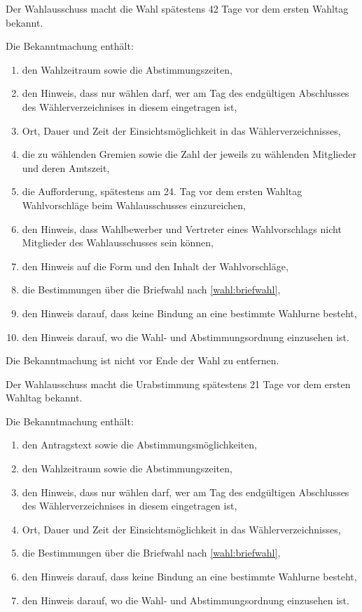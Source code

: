 \begin{jurdoc}
\label{wahl:bekanntmachung-wahl}
Der Wahlausschuss macht die Wahl spätestens 42 Tage vor dem ersten Wahltag bekannt.

Die Bekanntmachung enthält:
\begin{enumerate}
     \item den Wahlzeitraum sowie die Abstimmungszeiten,
     \item den Hinweis, dass nur wählen darf, wer am Tag des endgültigen Abschlusses des Wählerverzeichnises in diesem eingetragen ist,
     \item Ort, Dauer und Zeit der Einsichtsmöglichkeit in das Wählerverzeichnisses,
     \item die zu wählenden Gremien sowie die Zahl der jeweils zu wählenden Mitglieder und deren Amtszeit,
     \item die Aufforderung, spätestens am 24. Tag vor dem ersten Wahltag Wahlvorschläge beim Wahlausschusses einzureichen,
     \item den Hinweis, dass Wahlbewerber und Vertreter eines Wahlvorschlags nicht Mitglieder des Wahlausschusses sein können,
     \item den Hinweis auf die Form und den Inhalt der Wahlvorschläge,
     \item die Bestimmungen über die Briefwahl nach \ref{wahl:briefwahl},
     \item den Hinweis darauf, dass keine Bindung an eine bestimmte Wahlurne besteht,
     \item den Hinweis darauf, wo die Wahl- und Abstimmungsordnung einzusehen ist.
\end{enumerate}

Die Bekanntmachung ist nicht vor Ende der Wahl zu entfernen.

\label{wahl:bekanntmachung-ua}
Der Wahlausschuss macht die Urabstimmung spätestens 21 Tage vor dem ersten Wahltag bekannt.

Die Bekanntmachung enthält:
\begin{enumerate}
     \item den Antragstext sowie die Abstimmungsmöglichkeiten,
     \item den Wahlzeitraum sowie die Abstimmungszeiten,
     \item den Hinweis, dass nur wählen darf, wer am Tag des endgültigen Abschlusses des Wählerverzeichnises in diesem eingetragen ist,
     \item Ort, Dauer und Zeit der Einsichtsmöglichkeit in das Wählerverzeichnisses,
     \item die Bestimmungen über die Briefwahl nach \ref{wahl:briefwahl},
     \item den Hinweis darauf, dass keine Bindung an eine bestimmte Wahlurne besteht,
     \item den Hinweis darauf, wo die Wahl- und Abstimmungsordnung einzusehen ist.
\end{enumerate}


\end{jurdoc}
